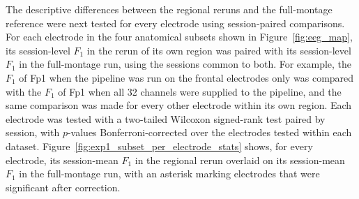 The descriptive differences between the regional reruns and the full-montage reference were next tested for every electrode using session-paired comparisons. For each electrode in the four anatomical subsets shown in Figure~\ref{fig:eeg_map}, its session-level $F_1$ in the rerun of its own region was paired with its session-level $F_1$ in the full-montage run, using the sessions common to both. For example, the $F_1$ of Fp1 when the pipeline was run on the frontal electrodes only was compared with the $F_1$ of Fp1 when all 32 channels were supplied to the pipeline, and the same comparison was made for every other electrode within its own region. Each electrode was tested with a two-tailed Wilcoxon signed-rank test paired by session, with $p$-values Bonferroni-corrected over the electrodes tested within each dataset. Figure~\ref{fig:exp1_subset_per_electrode_stats} shows, for every electrode, its session-mean $F_1$ in the regional rerun overlaid on its session-mean $F_1$ in the full-montage run, with an asterisk marking electrodes that were significant after correction.
